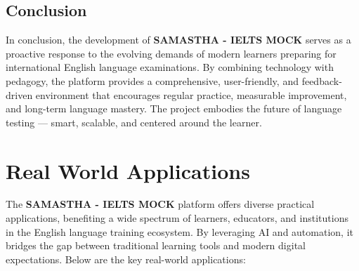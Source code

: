 \documentclass[a4paper,12pt]{article}
\begin{document}
\vspace{0.5cm}

\subsection{Conclusion}

In conclusion, the development of \textbf{SAMASTHA - IELTS MOCK} serves as a proactive response to the evolving demands of modern learners preparing for international English language examinations. By combining technology with pedagogy, the platform provides a comprehensive, user-friendly, and feedback-driven environment that encourages regular practice, measurable improvement, and long-term language mastery. The project embodies the future of language testing — smart, scalable, and centered around the learner.




\newpage
\section{Real World Applications}

\vspace{0.5cm}

The \textbf{SAMASTHA - IELTS MOCK} platform offers diverse practical applications, benefiting a wide spectrum of learners, educators, and institutions in the English language training ecosystem. By leveraging AI and automation, it bridges the gap between traditional learning tools and modern digital expectations. Below are the key real-world applications:

\vspace{0.3cm}
\end{document}
